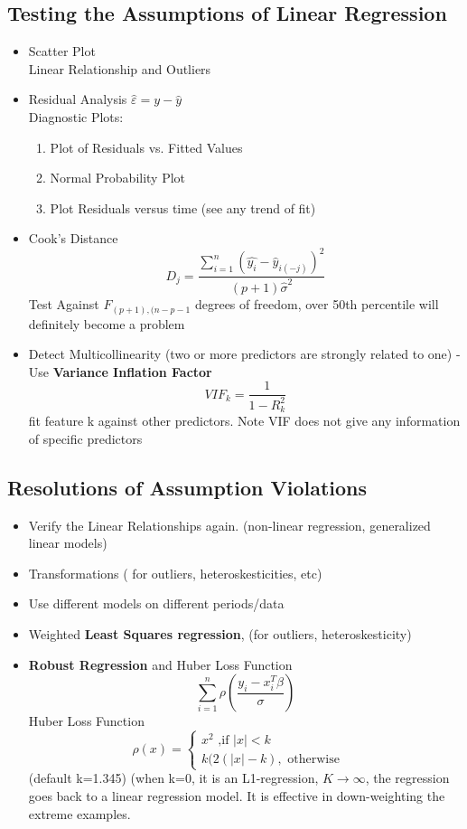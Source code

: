 \documentclass[11pt, openany]{book}              %
\begin{document}
\subsection{Testing the Assumptions of Linear Regression}

\begin{itemize}
    \item Scatter Plot \\ Linear Relationship and Outliers
    \item Residual Analysis $\hat{\varepsilon} = y - \hat{y}$ \\ Diagnostic Plots:
    \begin{enumerate}
        \item Plot of Residuals vs. Fitted Values
        \item Normal Probability Plot 
        \item Plot Residuals versus time (see any trend of fit)
	\end{enumerate}
	\item Cook's Distance $$D_j = \frac{\sum_{i=1}^n (\hat{y_i} - \hat{y}_{i(-j)})^2}{(p+1)\hat{\sigma}^2}$$ 
	Test Against $F_{(p+1),(n-p-1}$ degrees of freedom, over 50th percentile will definitely become a problem
	\item Detect Multicollinearity (two or more predictors are strongly related to one) - Use \textbf{Variance Inflation Factor}
		$$VIF_k = \frac{1}{1-R_k^2}$$
		fit feature k against other predictors. Note VIF does not give any information of specific predictors 
\end{itemize}

\subsection{Resolutions of Assumption Violations}

\begin{itemize}
    \item Verify the Linear Relationships again. (non-linear regression, generalized linear models)
    \item Transformations ( for outliers, heteroskesticities, etc)
    \item Use different models on different periods/data
    \item Weighted \textbf{Least Squares regression},  (for outliers, heteroskesticity) 
    \item \textbf{Robust Regression} and Huber Loss Function $$\sum_{i=1}^n \rho(\frac{y_i-x_i^T\beta}{\sigma})$$
		Huber Loss Function
		 $$\rho(x) = \left\{
             \begin{array}{lr}
             x^2 \text{  ,if } |x|<k &  \\
             k(2(|x|-k), \text{ otherwise } &  
             \end{array}
      \right.$$
       (default k=1.345) (when k=0, it is an L1-regression, $K\to \infty$, the regression goes back to a linear regression model. It is effective in down-weighting the extreme examples.
\end{itemize}
\end{document}
